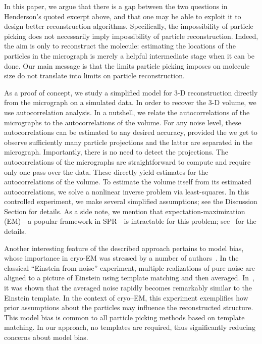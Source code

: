 \documentclass[english,11pt]{article}
\newcommand{\1}{\mathbf{1}}
\newcommand{\TODO}[1]{{\color{red}{[#1]}}}
\numberwithin{equation}{section}
\theoremstyle{plain}
\theoremstyle{definition}
\theoremstyle{remark}
\theoremstyle{plain}
\theoremstyle{remark}
\theoremstyle{plain}
\theoremstyle{plain}
\begin{document}
In this paper, we argue that there is a gap between the two questions in Henderson's quoted excerpt above, and that one may be able to exploit it to design better reconstruction algorithms.
Specifically, the impossibility of particle picking does not necessarily imply impossibility of particle reconstruction.
Indeed, the aim is only to reconstruct the molecule: estimating the locations of the particles in the micrograph is merely a helpful intermediate stage when it can be done. Our main message is that the limits particle picking imposes on molecule size do not translate into limits on particle reconstruction.

As a proof of concept, we study a simplified model for 3-D reconstruction directly from the micrograph on a simulated data. 
In order to recover the 3-D volume, we use autocorrelation analysis. In a nutshell, we relate the autocorrelations of the micrographs to the autocorrelations of the volume.
For any noise level, these autocorrelations can be estimated to any desired accuracy, provided the we get to observe sufficiently many particle projections and the latter are separated in the micrograph. Importantly, there is no need to detect the projections. The autocorrelations of the micrographs are straightforward to compute and require only one pass over the data. These directly yield estimates for the autocorrelations of the volume. To estimate the volume itself from its estimated autocorrelations, we solve a nonlinear inverse problem via least-squares. In this controlled experiment, we make several simplified assumptions; see the Discussion Section for details. 
As a side note, we mention that expectation-maximization (EM)---a popular framework in SPR---is intractable for this problem; see~\cite{bendory2018estimation} for the details. \TODO{Do we want to stress that we get only low-resolution of the volume?}


Another interesting feature of the described approach pertains to model bias, whose importance in cryo-EM was stressed by a number of authors~\cite{shatsky2009method,vanheel1992correlation,henderson2013avoiding,vanheel2013finding}. In the classical ``Einstein from noise'' experiment, multiple realizations of pure noise are aligned to a picture of Einstein using template matching and then averaged. In~\cite{shatsky2009method}, it was shown that the averaged noise rapidly becomes remarkably similar to the Einstein template. In the context of cryo--EM, this experiment exemplifies how prior assumptions about the particles may influence the reconstructed structure. This model bias is common to all particle picking methods based on template matching. In our approach, no templates are required, thus significantly reducing concerns about model bias. \TODO{To add reference to our example.}
\end{document}
